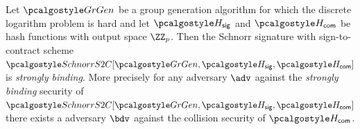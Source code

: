 \begin{theorem}\label{thm:schnorr-s2c-strong-bind}
    Let $\grgen$ be a group generation algorithm for which the discrete logarithm problem is hard and let $\algo{H}_{\mathsf{sig}}$ and $\algo{H}_{\mathsf{com}}$ be hash functions with output space $\ZZ_p$.
    Then the Schnorr signature with sign-to-contract scheme $\algo{SchnorrS2C}[\grgen, \algo{H}_{\mathsf{sig}}, \algo{H}_{\mathsf{com}}]$ is \emph{strongly binding}. More precisely for any \ppt adversary $\adv$ against the \emph{strongly binding} security of $\algo{SchnorrS2C}[\grgen, \algo{H}_{\mathsf{sig}}, \algo{H}_{\mathsf{com}}]$ there exists a \ppt adversary $\bdv$ against the collision security of $\algo{H}_{\mathsf{com}}$.
\end{theorem}


